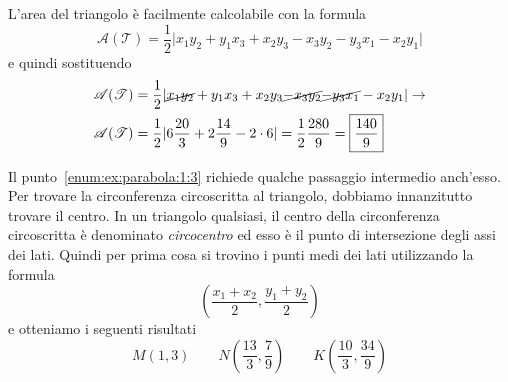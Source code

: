 \begin{center}
\end{center}
L'area del triangolo è facilmente calcolabile con la formula
\begin{equation*}
  \mathscr{A}(\mathscr{T}) = \frac{1}{2}\lvert
  x_1y_2+y_1x_3+x_2y_3
  -x_3y_2-y_3x_1-x_2y_1
  \rvert
\end{equation*}
e quindi sostituendo
\begin{align*}
  \mathscr{A}(\mathscr{T}) &= \frac{1}{2}\lvert
  \cancel{x_1y_2}+y_1x_3+x_2y_3
  \cancel{-x_3y_2}\cancel{-y_3x_1}-x_2y_1
  \rvert \rightarrow\\
  \mathscr{A}(\mathscr{T}) &= \frac{1}{2}\lvert 6\frac{20}{3}+2\frac{14}{9}-2\cdot6\rvert  = 
  \frac{1}{2}\frac{280}{9} = \boxed{\frac{140}{9}}
\end{align*}

Il punto~\ref{enum:ex:parabola:1:3} richiede qualche passaggio intermedio anch'esso. Per trovare la
circonferenza circoscritta al triangolo, dobbiamo innanzitutto trovare il centro. In un triangolo 
qualsiasi, il centro della circonferenza circoscritta è denominato \emph{circocentro} ed esso è il
punto di intersezione degli assi dei lati. Quindi per prima cosa si trovino i punti medi dei lati
utilizzando la formula
\begin{equation*}
  \left(\frac{x_1+x_2}{2},\frac{y_1+y_2}{2}\right)
\end{equation*}
e otteniamo i seguenti risultati
\begin{equation*}
  M(1,3) \qquad N\left(\frac{13}{3},\frac{7}{9}\right) \qquad K\left(\frac{10}{3},\frac{34}{9}\right)
\end{equation*}

